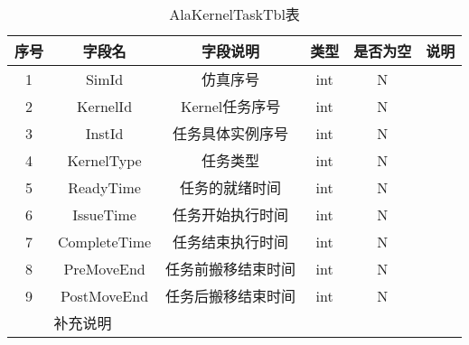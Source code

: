 \begin{table}[!h]
    \centering\normalsize
    \caption{AlaKernelTaskTbl表}
    \begin{tabular}{|c|c|c|c|c|c|}
    \hline
    \textbf{序号} & \textbf{字段名} & \textbf{字段说明} & \textbf{类型} & \textbf{是否为空} & \textbf{说明} \\ \hline
    1           & SimId        & 仿真序号          & int         & N             &             \\ \hline
    2           & KernelId     & Kernel任务序号    & int         & N             &             \\ \hline
    3           & InstId       & 任务具体实例序号      & int         & N             &             \\ \hline
    4           & KernelType   & 任务类型          & int         & N             &             \\ \hline
    5           & ReadyTime    & 任务的就绪时间       & int         & N             &             \\ \hline
    6           & IssueTime    & 任务开始执行时间      & int         & N             &             \\ \hline
    7           & CompleteTime & 任务结束执行时间      & int         & N             &             \\ \hline
    8           & PreMoveEnd   & 任务前搬移结束时间     & int         & N             &             \\ \hline
    9           & PostMoveEnd  & 任务后搬移结束时间     & int         & N             &             \\ \hline
    \multicolumn{2}{|c|}{补充说明} &               &             &               &             \\ \hline
    \end{tabular}
    \end{table}

